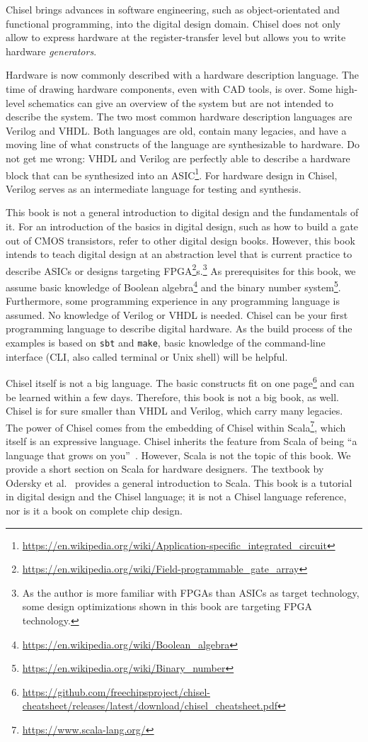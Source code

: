 \documentclass[%
    10pt,
    headinclude, footexclude,
    openright, %
    notitlepage,
    cleardoubleempty,
    headsepline,
    pointlessnumbers,
    bibtotoc, idxtotoc,
    ]{scrbook}
\newcommand{\code}[1]{{\small{\texttt{#1}}}}
\newcommand{\myref}[2]{\href{#1}{#2}}
\renewcommand{\myref}[2]{{#2}{\footnote{\url{#1}}}}
\begin{document}
Chisel brings advances in software engineering, such as object-orientated
and functional programming, into the digital design domain.
Chisel does not only allow to express hardware at the register-transfer level
but allows you to write hardware \emph{generators}.

Hardware is now commonly described with a hardware description language.
The time of drawing hardware components, even with CAD tools, is
over. Some high-level schematics can give an overview of the system but are
not intended to describe the system.
The two most common hardware description languages are Verilog and VHDL.
Both languages are old, contain many legacies, and have a moving line of what
constructs of the language are synthesizable to hardware.
Do not get me wrong: VHDL and Verilog are perfectly able to describe a hardware
block that can be synthesized into an
\myref{https://en.wikipedia.org/wiki/Application-specific_integrated_circuit}{ASIC}.
For hardware design in Chisel, Verilog serves as an intermediate language
for testing and synthesis.

This book is not a general introduction to digital design and the fundamentals of it.
For an introduction of the basics in digital design, such as how to build a gate out of
CMOS transistors, refer to other digital design books.
However, this book intends to teach digital design at an abstraction level that is
current practice to describe ASICs or designs targeting
\myref{https://en.wikipedia.org/wiki/Field-programmable_gate_array}{FPGA}s.\footnote{As the author is more familiar with FPGAs
than ASICs as target technology, some design optimizations shown in this book are
targeting FPGA technology.}
As prerequisites for this book, we assume basic knowledge of
\myref{https://en.wikipedia.org/wiki/Boolean_algebra}{Boolean algebra} and the
\myref{https://en.wikipedia.org/wiki/Binary_number}{binary number system}.
Furthermore, some programming experience in any programming language
is assumed. No knowledge of Verilog or VHDL is needed.
Chisel can be your first programming language to describe digital hardware.
As the build process of the examples is based on \code{sbt} and \code{make},
basic knowledge of the command-line interface (CLI, also called terminal or
Unix shell) will be helpful.

Chisel itself is not a big language. The basic constructs fit on
\myref{https://github.com/freechipsproject/chisel-cheatsheet/releases/latest/download/chisel_cheatsheet.pdf}{one page}
and can be learned within a few days.
Therefore, this book is not a big book, as well.
Chisel is for sure smaller than VHDL and Verilog, which carry many legacies.
The power of Chisel comes from the embedding of Chisel within
\myref{https://www.scala-lang.org/}{Scala}, which itself is an expressive language.
Chisel inherits the feature from Scala of being ``a language that grows on you''~\cite{Scala}.
However, Scala is not the topic of this book.
We provide a short section on Scala for hardware designers.
The textbook by Odersky et al.~\cite{Scala} provides a general introduction
to Scala.
This book is a tutorial in digital design and the Chisel language; it is not
a Chisel language reference, nor is it a book on complete chip design.
\end{document}
